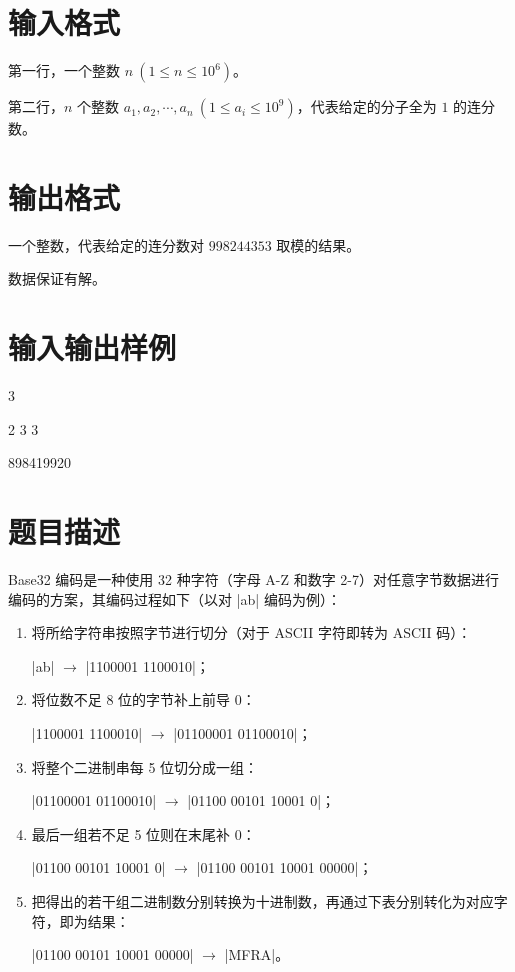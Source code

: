 \documentclass{ctpro}
\begin{document}
\section*{输入格式}
第一行，一个整数 $n~(1 \leq n \leq {10}^6)$。

第二行，$n$ 个整数 $a_1, a_2, \cdots, a_n~(1 \leq a_i \leq {10}^9)$，代表给定的分子全为 $1$ 的连分数。

\section*{输出格式}
一个整数，代表给定的连分数对 $998244353$ 取模的结果。

数据保证有解。

\section*{输入输出样例}
\testcasetab
{
	3\par
	2 3 3
}
{
	898419920
}

\makeproblem
\section*{题目描述}

Base32 编码是一种使用 32 种字符（字母 A-Z 和数字 2-7）对任意字节数据进行编码的方案，其编码过程如下（以对 |ab| 编码为例）：

\begin{enumerate}
	\item 将所给字符串按照字节进行切分（对于 ASCII 字符即转为 ASCII 码）：\par
	      |ab| $\rightarrow$ |1100001 1100010|；
	\item 将位数不足 8 位的字节补上前导 0：\par
	      |1100001 1100010| $\rightarrow$ |01100001 01100010|；
	\item 将整个二进制串每 5 位切分成一组：\par
	      |01100001 01100010| $\rightarrow$ |01100 00101 10001 0|；
	\item 最后一组若不足 5 位则在末尾补 0：\par
	      |01100 00101 10001 0| $\rightarrow$ |01100 00101 10001 00000|；
	\item 把得出的若干组二进制数分别转换为十进制数，再通过下表分别转化为对应字符，即为结果：\par
	      |01100 00101 10001 00000| $\rightarrow$ |MFRA|。
\end{enumerate}
\end{document}
